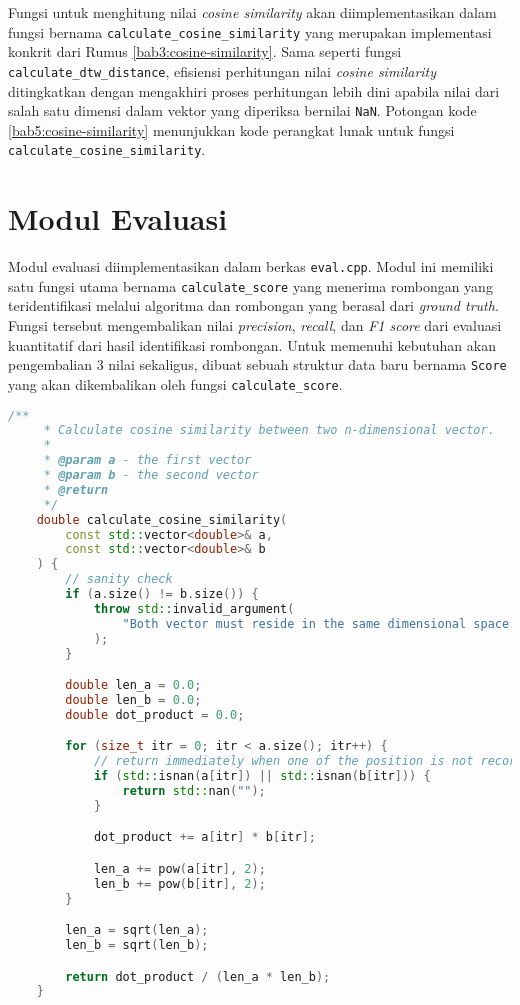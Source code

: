 Fungsi untuk menghitung nilai \textit{cosine similarity} akan diimplementasikan dalam fungsi bernama \texttt{calculate\_cosine\_similarity} yang merupakan implementasi konkrit dari Rumus \ref{bab3:cosine-similarity}. Sama seperti fungsi \texttt{calculate\_dtw\_distance}, efisiensi perhitungan nilai \textit{cosine similarity} ditingkatkan dengan mengakhiri proses perhitungan lebih dini apabila nilai dari salah satu dimensi dalam vektor yang diperiksa bernilai \texttt{NaN}. Potongan kode \ref{bab5:cosine-similarity} menunjukkan kode perangkat lunak untuk fungsi \texttt{calculate\_cosine\_similarity}.

\section{Modul Evaluasi}
\label{sec:impl-eval}

Modul evaluasi diimplementasikan dalam berkas \texttt{eval.cpp}. Modul ini memiliki satu fungsi utama bernama \texttt{calculate\_score} yang menerima rombongan yang teridentifikasi melalui algoritma dan rombongan yang berasal dari \textit{ground truth}. Fungsi tersebut mengembalikan nilai \textit{precision}, \textit{recall}, dan \textit{F1 score} dari evaluasi kuantitatif dari hasil identifikasi rombongan. Untuk memenuhi kebutuhan akan pengembalian 3 nilai sekaligus, dibuat sebuah struktur data baru bernama \texttt{Score} yang akan dikembalikan oleh fungsi \texttt{calculate\_score}.

\begin{lstlisting}[language=C++, caption=Implementasi fungsi \texttt{calculate\_cosine\_similarity}, label={bab5:cosine-similarity}]
    /**
     * Calculate cosine similarity between two n-dimensional vector.
     * 
     * @param a - the first vector
     * @param b - the second vector
     * @return 
     */
    double calculate_cosine_similarity(
        const std::vector<double>& a,
        const std::vector<double>& b
    ) {
        // sanity check
        if (a.size() != b.size()) {
            throw std::invalid_argument(
                "Both vector must reside in the same dimensional space."
            );
        }

        double len_a = 0.0;
        double len_b = 0.0;
        double dot_product = 0.0;

        for (size_t itr = 0; itr < a.size(); itr++) {
            // return immediately when one of the position is not recorded
            if (std::isnan(a[itr]) || std::isnan(b[itr])) {
                return std::nan("");
            }

            dot_product += a[itr] * b[itr];

            len_a += pow(a[itr], 2);
            len_b += pow(b[itr], 2);
        }

        len_a = sqrt(len_a);
        len_b = sqrt(len_b);

        return dot_product / (len_a * len_b);
    }
\end{lstlisting}

